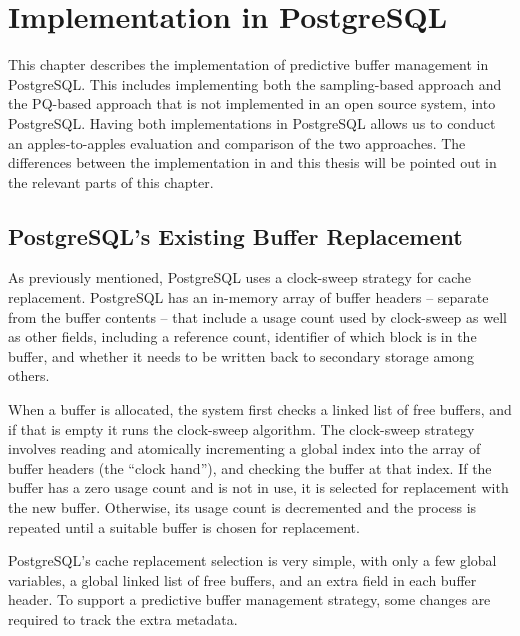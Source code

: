 
\chapter{\label{sec:pbm-pq_postgres}Implementation in P\MakeLowercase{ostgre}SQL}


This chapter describes the implementation of predictive buffer management in PostgreSQL. This includes implementing both the sampling-based approach and the PQ-based approach that is not implemented in an open source system, into PostgreSQL. Having both implementations in PostgreSQL allows us to conduct an apples-to-apples evaluation and  comparison of the two approaches. The differences between the implementation in \cite{pbm} and this thesis will be pointed out in the relevant parts of this chapter.



\section{PostgreSQL's Existing Buffer Replacement}

As previously mentioned, PostgreSQL uses a clock-sweep strategy for cache replacement. PostgreSQL has an in-memory array of buffer headers -- separate from the buffer contents -- that include a usage count used by clock-sweep as well as other fields, including a reference count, identifier of which block is in the buffer, and whether it needs to be written back to secondary storage among others.

When a buffer is allocated, the system first checks a linked list of free buffers, and if that is empty it runs the clock-sweep algorithm. The clock-sweep strategy involves reading and atomically incrementing a global index into the array of buffer headers (the ``clock hand''), and checking the buffer at that index. If the buffer has a zero usage count and is not in use, it is selected for replacement with the new buffer. Otherwise, its usage count is decremented and the process is repeated until a suitable buffer is chosen for replacement.

PostgreSQL's cache replacement selection is very simple, with only a few global variables, a global linked list of free buffers, and an extra field in each buffer header. To support a predictive buffer management strategy, some changes are required to track the extra metadata.


